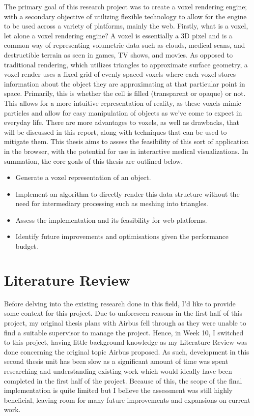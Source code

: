 \documentclass[titlepage]{article}
\begin{document}
The primary goal of this research project was to create a voxel rendering engine; with a secondary objective of utilizing flexible technology to allow for the engine to be used across a variety of platforms, mainly the web. Firstly, what is a voxel, let alone a voxel rendering engine? A voxel is essentially a 3D pixel and is a common way of representing volumetric data such as clouds, medical scans, and destructible terrain as seen in games, TV shows, and movies. As opposed to traditional rendering, which utilizes triangles to approximate surface geometry, a voxel render uses a fixed grid of evenly spaced voxels where each voxel stores information about the object they are approximating at that particular point in space. Primarily, this is whether the cell is filled (transparent or opaque) or not. This allows for a more intuitive representation of reality, as these voxels mimic particles and allow for easy manipulation of objects as we've come to expect in everyday life. There are more advantages to voxels, as well as drawbacks, that will be discussed in this report, along with techniques that can be used to mitigate them. This thesis aims to assess the feasibility of this sort of application in the browser, with the potential for use in interactive medical visualizations. In summation, the core goals of this thesis are outlined below.

\begin{itemize}
  \item Generate a voxel representation of an object.
  \item Implement an algorithm to directly render this data structure without the need for intermediary processing such as meshing into triangles.
  \item Assess the implementation and its feasibility for web platforms.
  \item Identify future improvements and optimisations given the performance budget.
\end{itemize}

\section{Literature Review}

Before delving into the existing research done in this field, I'd like to provide some context for this project. Due to unforeseen reasons in the first half of this project, my original thesis plans with Airbus fell through as they were unable to find a suitable supervisor to manage the project. Hence, in Week 10, I switched to this project, having little background knowledge as my Literature Review was done concerning the original topic Airbus proposed. As such, development in this second thesis unit has been slow as a significant amount of time was spent researching and understanding existing work which would ideally have been completed in the first half of the project. Because of this, the scope of the final implementation is quite limited but I believe the assessment was still highly beneficial, leaving room for many future improvements and expansions on current work.
\end{document}
